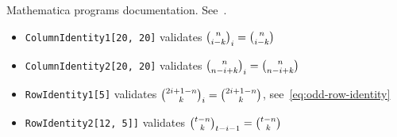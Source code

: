 Mathematica programs documentation.
See~\cite{kolosov2024identities}.
\begin{itemize}
    \item \texttt{ColumnIdentity1[20, 20]} validates $\binom{n}{i-k}_{i} = \binom{n}{i-k}$
    \item \texttt{ColumnIdentity2[20, 20]} validates $\binom{n}{n-i+k}_{i} = \binom{n}{n-i+k}$
    \item \texttt{RowIdentity1[5]} validates $\binom{2i+1-n}{k}_{i} = \binom{2i+1-n}{k}$, see~\eqref{eq:odd-row-identity}
    \item \texttt{RowIdentity2[12, 5]]} validates $\binom{t-n}{k}_{t-i-1}= \binom{t-n}{k}$
\end{itemize}
